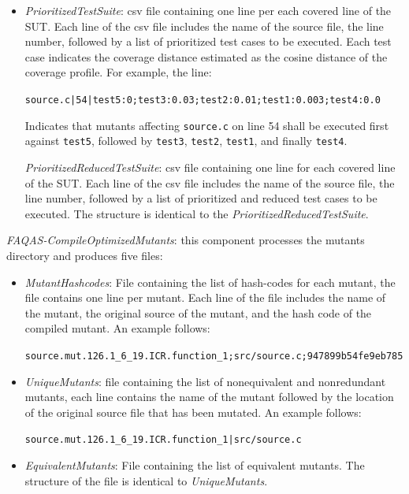 \begin{itemize}
{	\begin{itemize}
		\item \textit{PrioritizedTestSuite}: csv file containing one line per each covered line of the SUT. Each line of the csv file includes the name of the source file, the line number, followed by a list of prioritized test cases to be executed. Each test case indicates the coverage distance estimated as the cosine distance of the coverage profile. For example, the line:

		\texttt{source.c|54|test5:0;test3:0.03;test2:0.01;test1:0.003;test4:0.0}

		Indicates that mutants affecting \texttt{source.c} on line 54 shall be executed first against \texttt{test5}, followed by \texttt{test3}, \texttt{test2}, \texttt{test1}, and finally \texttt{test4}.

		\textit{PrioritizedReducedTestSuite}: csv file containing one line for each covered line of the SUT. Each line of the csv file includes the name of the source file, the line number, followed by a list of prioritized and reduced test cases to be executed. The structure is identical to the \textit{PrioritizedReducedTestSuite}.
	\end{itemize}

	\item \textit{FAQAS-CompileOptimizedMutants}: this component processes the mutants directory and produces five files:
	\begin{itemize}
		\item \textit{MutantHashcodes}: File containing the list of hash-codes for each mutant, the file contains one line per mutant. Each line of the file includes the name of the mutant, the original source of the mutant, and the hash code of the compiled mutant. An example follows:

		\texttt{source.mut.126.1\_6\_19.ICR.function\_1;src/source.c;947899b54fe9eb785}

		\item \textit{UniqueMutants}: file containing the list of nonequivalent and nonredundant mutants, each line contains the name of the mutant followed by the location of the original source file that has been mutated. An example follows:

		\texttt{source.mut.126.1\_6\_19.ICR.function\_1|src/source.c}
		
		\item \textit{EquivalentMutants}: File containing the list of equivalent mutants. The structure of the file is identical to \textit{UniqueMutants}.
		

\end{itemize}}
\end{itemize}
